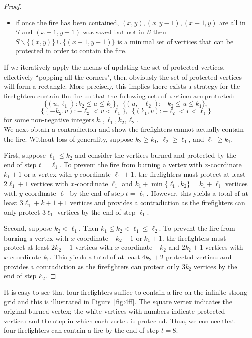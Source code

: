 \documentclass[12pt]{article}
\begin{document}
\begin{proof}
\begin{itemize}
\item if once the fire has been contained, $(x,y),(x,y-1),(x+1,y)$ are all in $S$ and $(x-1,y-1)$ was saved but not in $S$ then $S \backslash \{(x,y)\} \cup \{(x-1,y-1)\}$ is a minimal set of vertices that can be protected in order to contain the fire.  
\end{itemize}

If we iteratively apply the means of updating the set of protected vertices, effectively ``popping all the corners", then obviously the set of protected vertices will form a rectangle.  More precisely, this implies there exists a strategy for the firefighters contain the fire so that the following sets of vertices are protected: $$\{(u,\ell_1): k_2 \leq u \leq k_1\},~~\{(u,-\ell_2):-k_2 \leq u \leq k_1\},$$ $$\{(-k_2,v): -\ell_2 < v < \ell_1\},~~\{(k_1,v):-\ell_2 < v < \ell_1\}$$ for some non-negative integers $k_1,\ell_1,k_2,\ell_2$.\\

We next obtain a contradiction and show the firefighters cannot actually contain the fire.  Without loss of generality, suppose $k_2 \geq k_1$, $\ell_2 \geq \ell_1$, and $\ell_1 \geq k_1$. 

First,  suppose $\ell_1 \leq k_2$ and consider the vertices burned and protected by the end of step $t = \ell_1$.  To prevent the fire from burning a vertex with $x$-coordinate $k_1+1$ or a vertex with $y$-coordinate $\ell_1+1$, the firefighters must protect at least $2\ell_1+1$ vertices with $x$-coordinate $\ell_1$ and $k_1+\min\{\ell_1,k_2\}=k_1+\ell_1$ vertices with $y$-coordinate $\ell_1$ by the end of step $t=\ell_1$. However, this yields a total of at least $3\ell_1+k+1+1$ vertices and provides a contradiction as the firefighters can only protect $3\ell_1$ vertices by the end of step $\ell_1$.  

Second, suppose $k_2 < \ell_1$.  Then $k_1 \leq k_2 < \ell_1 \leq \ell_2$.  To prevent the fire from burning a vertex with $x$-coordinate $-k_2-1$ or $k_1+1$, the firefighters must protect at least $2k_2+1$ vertices with $x$-coordinate $-k_2$ and $2k_2+1$ vertices with $x$-coordinate $k_1$.  This yields a total of at least $4k_2+2$ protected vertices and provides a contradiction as the firefighters can protect only $3k_2$ vertices by the end of step $k_2$.\end{proof} 

It is easy to see that four firefighters suffice to contain a fire on the infinite strong grid and this is illustrated in Figure~\ref{fig:4ff}.  The square vertex indicates the original burned vertex; the white vertices with numbers indicate protected vertices and the step in which each vertex is protected.  Thus, we can see that four firefighters can contain a fire by the end of step $t=8$.
\end{document}
